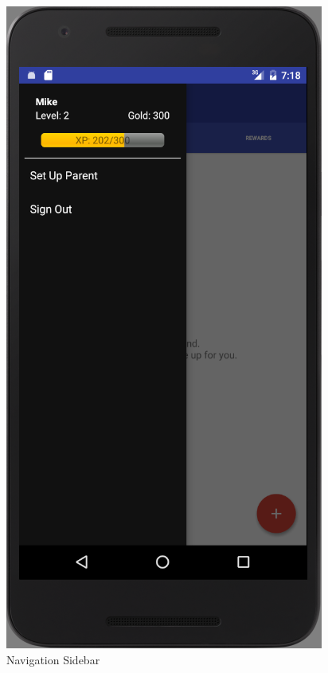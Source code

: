 \begin{figure}[ht]
\begin{minipage}[b]{0.45\linewidth}
    \includegraphics[width=.7\linewidth, frame]{../images/Screenshot/NavigationBar.png}
    \caption{Navigation Sidebar} 
    \vspace{4ex}
  \end{minipage} 
  \begin{minipage}[b]{0.45\linewidth}
    \centering

\end{minipage}
\end{figure}
